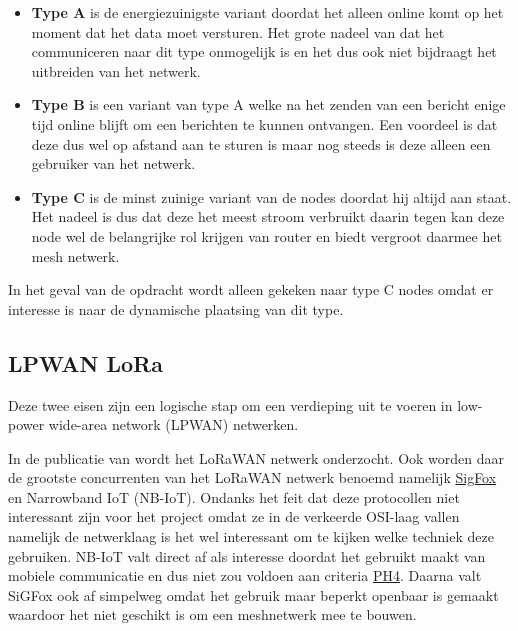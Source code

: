 \documentclass[a4paper, 11pt, oneside]{report}
\begin{document}
\begin{itemize}
	\item \textbf{Type A} is de energiezuinigste variant doordat het alleen online komt op het moment dat het data moet versturen.
Het grote nadeel van dat het communiceren naar dit type onmogelijk is en het dus ook niet bijdraagt het uitbreiden van het netwerk.
	\item \textbf{Type B} is een variant van type A welke na het zenden van een bericht enige tijd online blijft om een berichten te kunnen ontvangen. 
Een voordeel is dat deze dus wel op afstand aan te sturen is maar nog steeds is deze alleen een gebruiker van het netwerk.
	\item \textbf{Type C} is de minst zuinige variant van de nodes doordat hij altijd aan staat.
Het nadeel is dus dat deze het meest stroom verbruikt daarin tegen kan deze node wel de belangrijke rol krijgen van router en biedt vergroot daarmee het mesh netwerk.
\end{itemize}

In het geval van de opdracht wordt alleen gekeken naar type C nodes omdat er interesse is naar de dynamische plaatsing van dit type.





\subsection{LPWAN LoRa}
Deze twee eisen zijn een logische stap om een verdieping uit te voeren in low-power wide-area network (LPWAN) netwerken.

In de publicatie van \cite{LoraConnect} wordt het LoRaWAN netwerk onderzocht.
Ook worden daar de grootste concurrenten van het LoRaWAN netwerk benoemd namelijk \href{https://www.sigfox.com/en}{SigFox} en Narrowband IoT (NB-IoT).
Ondanks het feit dat deze protocollen niet interessant zijn voor het project omdat ze in de verkeerde OSI-laag vallen namelijk de netwerklaag is het wel interessant om te kijken welke techniek deze gebruiken.
NB-IoT valt direct af als interesse doordat het gebruikt maakt van mobiele communicatie en dus niet zou voldoen aan criteria \hyperlink{ph4}{PH4}.
Daarna valt SiGFox ook af simpelweg omdat het gebruik maar beperkt openbaar is gemaakt waardoor het niet geschikt is om een meshnetwerk mee te bouwen. 
\end{document}

